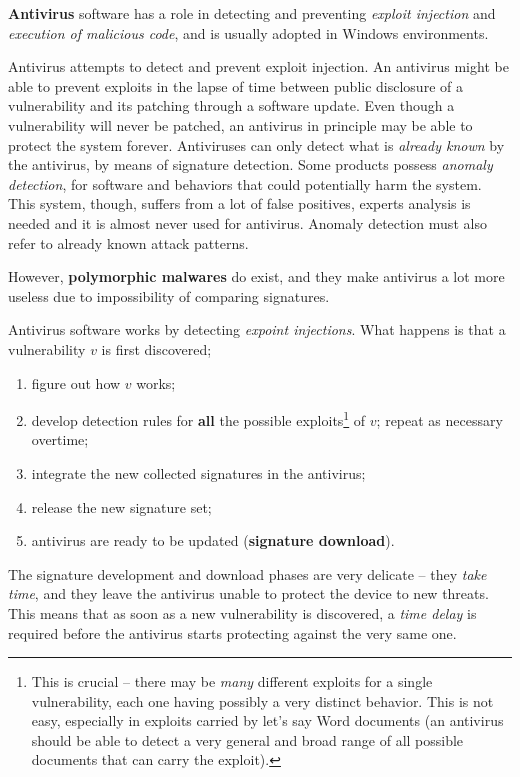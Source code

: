 \documentclass[10pt]{extbook}
\begin{document}
\textbf{Antivirus} software has a role in detecting and preventing
\emph{exploit injection} and \emph{execution of malicious code}, and is usually
adopted in Windows environments.

Antivirus attempts to detect and prevent exploit injection. An antivirus might
be able to prevent exploits in the lapse of time between public disclosure of a
vulnerability and its patching through a software update. Even though a
vulnerability will never be patched, an antivirus in principle may be able to
protect the system forever. Antiviruses can only detect what is \emph{already
known} by the antivirus, by means of signature detection. Some products possess
\emph{anomaly detection}, for software and behaviors that could potentially
harm the system. This system, though, suffers from a lot of false positives,
experts analysis is needed and it is almost never used for antivirus. Anomaly
detection must also refer to already known attack patterns.

However, \textbf{polymorphic malwares} do exist, and they make antivirus
a lot more useless due to impossibility of comparing signatures.


Antivirus software works by detecting \emph{expoint injections}. What happens is that a vulnerability $v$ is first discovered; 
\begin{enumerate}
    \item figure out how $v$ works;
    \item develop detection rules for \textbf{all} the possible
        exploits\footnote{This is crucial -- there may be \emph{many} different
        exploits for a single vulnerability, each one having possibly a very
    distinct behavior. This is not easy, especially in exploits carried by
let's say Word documents (an antivirus should be able to detect a very general
and broad range of all possible documents that can carry the exploit).} of $v$;
repeat as necessary overtime; 
    \item integrate the new collected signatures in the antivirus;
    \item release the new signature set;
    \item antivirus are ready to be updated (\textbf{signature download}).
\end{enumerate}

The signature development and download phases are very delicate -- they
\emph{take time}, and they leave the antivirus unable to protect the device to
new threats. This means that as soon as a new vulnerability is discovered, a
\emph{time delay} is required before the antivirus starts protecting against
the very same one. 
\end{document}
